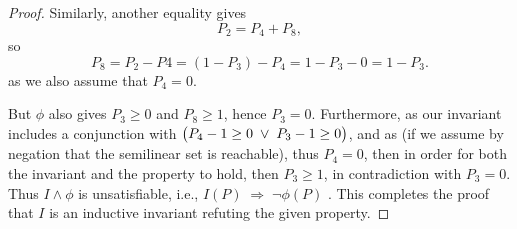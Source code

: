 \begin{proof}
	
	\noindent
	Similarly, another equality gives
	\[
	P_{2}=P_{4}+P_{8},
	\]
	so
	\[
	P_{8}=P_2-P4=(1-P_{3})-P_{4}=1-P_{3}-0=1-P_3.
	\]
	as we also assume that $P_4=0$.
	
	
	\noindent
	But $\phi$ also gives $P_{3}\ge0$ and $P_{8}\ge1$, hence $P_{3}=0$.  
	Furthermore, as our invariant includes a conjunction with $\bigl(P_{4}-1\ge0\;\lor\;\textcolor{black}{P_{3}}-1\ge0\bigr)$, and as (if we assume by negation that the semilinear set is reachable), thus $P_4=0$, then in order for both the invariant and the property to hold, then $P_3 \ge 1$, in contradiction with $P_3=0$.
	  Thus $I\land\phi$ is unsatisfiable, i.e., 
	$
	I(P)\;\Longrightarrow\;\neg\phi(P)$
	.
	This completes the proof that $I$ is an inductive invariant refuting the given property.
\end{proof}


\newpage